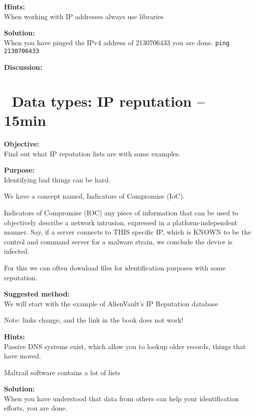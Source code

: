 \documentclass[a4paper,11pt,notitlepage]{report}
\begin{document}
{\bf Hints:}\\
When working with IP addresses always use libraries

{\bf Solution:}\\
When you have pinged the IPv4 address of 2130706433 you are done.
\verb+ping 2130706433+


{\bf Discussion:}\\



\chapter{\faExclamationTriangle\ Data types: IP reputation -- 15min}
\label{siem:ip-reputation}

{\bf Objective:}\\
Find out what IP reputation lists are with some examples.


{\bf Purpose:}\\
Identifying bad things can be hard.

We have a concept named, Indicators of Compromise (IoC).

Indicators of Compromise (IOC) any piece of information that can be used to objectively describe a network intrusion, expressed in a platform-independent manner. Say, if a server connects to THIS specific IP, which is KNOWN to be the control and command server for a malware strain, we conclude the device is infected.

For this we can often download files for identification purposes with some reputation.

{\bf Suggested method:}\\
We will start with the example of
AlienVault’s IP Reputation database

Note: links change, and the link in the book does not work!




{\bf Hints:}\\
Passive DNS systems exist, which allow you to lookup older records, things that have moved.

Maltrail software contains a lot of lists\\

{\bf Solution:}\\
When you have understood that data from others can help your identification efforts, you are done.
\end{document}

